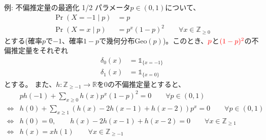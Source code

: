 \documentclass[lualatex,handout]{beamer}
\newcommand{\mycolor}[2]{%
  \begingroup
  \colorlet{currentcolor}{.}%
  \color{#1}#2%
  \color{currentcolor}%
  \endgroup
}
\newcommand{\emm}[1]{\mycolor{red}{#1}}
\theoremstyle{definition}
\begin{document}
\begin{frame}{例: 不偏推定量の最適化 1/2}
\small
パラメータ$p\in(0,1)$について、
\begin{align*}
\Pr(X=-1\mid p) &= p\\
\Pr(X=x\mid p) &= p^x (1-p)^2 \qquad\forall x\in\mathbb{Z}_{\ge 0}
\end{align*}
とする(確率$p$で$-1$、確率$1-p$で幾何分布$\mathrm{Geo}(p)$)。このとき、$\emm{p}$と$\emm{(1-p)^2}$の不偏推定量をそれぞれ
\begin{align*}
\delta_0(x) &=\mathbb{1}_{\{x = -1\}}\\
\delta_1(x) &=\mathbb{1}_{\{x = 0\}}
\end{align*}
とする。
また、$h\colon\mathbb{Z}_{\ge -1}\to\mathbb{R}$を$0$の不偏推定量とすると、
\begin{align*}
&ph(-1) + \sum_{x\ge 0} h(x) p^x (1-p)^2 = 0\qquad\forall p\in(0,1)\\
\iff&h(0) + \sum_{x\ge 1} (h(x)-2h(x-1)+h(x-2)) p^x = 0\qquad\forall p\in(0,1)\\
\iff&h(0)=0,\qquad h(x)-2h(x-1)+h(x-2) = 0\qquad\forall x\in\mathbb{Z}_{\ge1}\\
\iff&h(x)=xh(1)\qquad\forall x\in\mathbb{Z}_{\ge-1}\\
\end{align*}
\end{frame}
\end{document}
